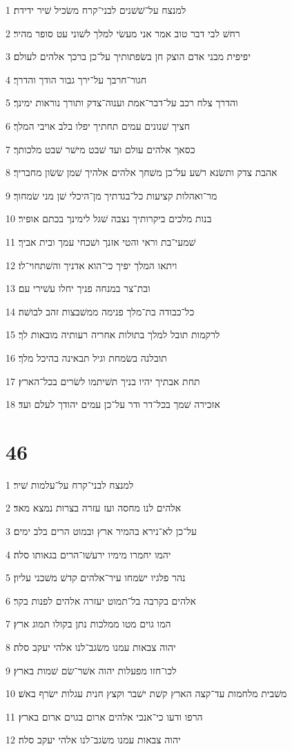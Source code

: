 \par 1 למנצח על־שׁשׁנים לבני־קרח משׂכיל שׁיר ידידת׃
\par 2 רחשׁ לבי דבר טוב אמר אני מעשׂי למלך לשׁוני עט סופר מהיר׃
\par 3 יפיפית מבני אדם הוצק חן בשׂפתותיך על־כן ברכך אלהים לעולם׃
\par 4 חגור־חרבך על־ירך גבור הודך והדרך׃
\par 5 והדרך צלח רכב על־דבר־אמת וענוה־צדק ותורך נוראות ימינך׃
\par 6 חציך שׁנונים עמים תחתיך יפלו בלב אויבי המלך׃
\par 7 כסאך אלהים עולם ועד שׁבט מישׁר שׁבט מלכותך׃
\par 8 אהבת צדק ותשׂנא רשׁע על־כן משׁחך אלהים אלהיך שׁמן שׂשׂון מחבריך׃
\par 9 מר־ואהלות קציעות כל־בגדתיך מן־היכלי שׁן מני שׂמחוך׃
\par 10 בנות מלכים ביקרותיך נצבה שׁגל לימינך בכתם אופיר׃
\par 11 שׁמעי־בת וראי והטי אזנך ושׁכחי עמך ובית אביך׃
\par 12 ויתאו המלך יפיך כי־הוא אדניך והשׁתחוי־לו׃
\par 13 ובת־צר במנחה פניך יחלו עשׁירי עם׃
\par 14 כל־כבודה בת־מלך פנימה ממשׁבצות זהב לבושׁה׃
\par 15 לרקמות תובל למלך בתולות אחריה רעותיה מובאות לך׃
\par 16 תובלנה בשׂמחת וגיל תבאינה בהיכל מלך׃
\par 17 תחת אבתיך יהיו בניך תשׁיתמו לשׂרים בכל־הארץ׃
\par 18 אזכירה שׁמך בכל־דר ודר על־כן עמים יהודך לעלם ועד׃

\chapter{46}

\par 1 למנצח לבני־קרח על־עלמות שׁיר׃
\par 2 אלהים לנו מחסה ועז עזרה בצרות נמצא מאד׃
\par 3 על־כן לא־נירא בהמיר ארץ ובמוט הרים בלב ימים׃
\par 4 יהמו יחמרו מימיו ירעשׁו־הרים בגאותו סלה׃
\par 5 נהר פלגיו ישׂמחו עיר־אלהים קדשׁ משׁכני עליון׃
\par 6 אלהים בקרבה בל־תמוט יעזרה אלהים לפנות בקר׃
\par 7 המו גוים מטו ממלכות נתן בקולו תמוג ארץ׃
\par 8 יהוה צבאות עמנו משׂגב־לנו אלהי יעקב סלה׃
\par 9 לכו־חזו מפעלות יהוה אשׁר־שׂם שׁמות בארץ׃
\par 10 משׁבית מלחמות עד־קצה הארץ קשׁת ישׁבר וקצץ חנית עגלות ישׂרף באשׁ׃
\par 11 הרפו ודעו כי־אנכי אלהים ארום בגוים ארום בארץ׃
\par 12 יהוה צבאות עמנו משׂגב־לנו אלהי יעקב סלה׃

